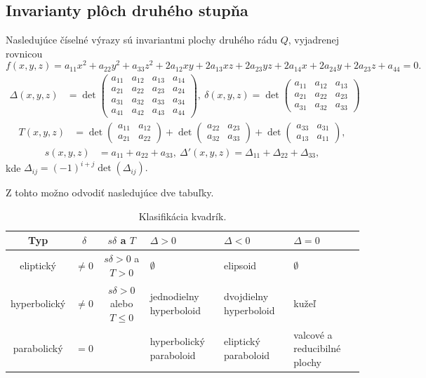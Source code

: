 \subsection{Invarianty plôch druhého stupňa}
Nasledujúce číselné výrazy sú invariantmi plochy druhého rádu $Q$, vyjadrenej rovnicou 
\[ f(x, y, z) = a_{11}x^2 + a_{22}y^2 + a_{33}z^2 + 2a_{12}xy + 2a_{13}xz + 2a_{23}yz + 2a_{14}x + 2a_{24}y + 2a_{23}z + a_{44} = 0. \]
\begin{align*}
\Delta(x, y, z) &= \det \begin{pmatrix} 
a_{11} & a_{12} & a_{13} & a_{14} \\ 
a_{21} & a_{22} & a_{23} & a_{24} \\
a_{31} & a_{32} & a_{33} & a_{34} \\
a_{41} & a_{42} & a_{43} & a_{44}
\end{pmatrix}, \
\delta(x, y, z) = \det \begin{pmatrix} 
a_{11} & a_{12} & a_{13} \\ 
a_{21} & a_{22} & a_{23} \\ 
a_{31} & a_{32} & a_{33} 
\end{pmatrix}
\end{align*}
\begin{align*}
T(x, y, z) &= \det \begin{pmatrix} 
a_{11} & a_{12} \\ 
a_{21} & a_{22} 
\end{pmatrix} + \det \begin{pmatrix} 
a_{22} & a_{23} \\ 
a_{32} & a_{33} 
\end{pmatrix} + \det \begin{pmatrix} 
a_{33} & a_{31} \\ 
a_{13} & a_{11} 
\end{pmatrix}, 
\end{align*}
\begin{align*}
s(x, y, z) &= a_{11} + a_{22} + a_{33}, \ \Delta'(x, y, z) = \Delta_{11} + \Delta_{22} + \Delta_{33}, 
\end{align*}
kde $
\Delta_{ij} = (-1)^{i+j} \det(\Delta_{ij}).$

Z tohto možno odvodiť nasledujúce dve tabuľky.

\begin{table}[h!]
\centering
\begin{tabular}{|c|c|c|p{2.2cm}|p{2.15cm}|p{2cm}|}
\hline
Typ & $\delta$ & $s\delta$ a $T$ & $\Delta > 0$ & $\Delta < 0$ & $\Delta = 0$ \\
\hline
eliptický & $\neq 0$ & $s\delta>0$ a $T>0$ & $\emptyset$ & elipsoid & $\emptyset$ \\
\hline
hyperbolický & $\neq 0$ & $s\delta>0$ alebo $T \leq0$ & jednodielny hyperboloid & dvojdielny hyperboloid & kužeľ \\
\hline
parabolický & $=0$ & & hyperbolický paraboloid & eliptický paraboloid & valcové a reducibilné plochy \\
\hline
\end{tabular}
\caption{Klasifikácia kvadrík.}
\label{tab:classification_of_quadrics}
\end{table}

